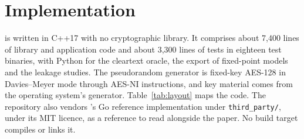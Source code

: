 \section{Implementation}
\label{sec:impl}

\sys{} is written in C++17 with no cryptographic library. It comprises about
7{,}400 lines of library and application code and about 3{,}300 lines of tests
in eighteen test binaries, with Python for the cleartext oracle, the export of
fixed-point models and the leakage studies. The pseudorandom generator is fixed-key
AES-128 in Davies--Meyer mode through AES-NI instructions, and key material comes
from the operating system's generator. Table~\ref{tab:layout} maps the code. The
repository also vendors \nudgeplain{}'s Go reference implementation under
\texttt{third\_party/}, under its MIT licence, as a reference to read alongside the
paper. No build target compiles or links it.


